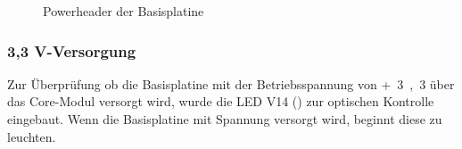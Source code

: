 \begin{figure}[H]
    \centering
    \qquad
    \qquad
    \caption[Powerheader der Basisplatine]{Powerheader der \gls{Basisplatine}}
    \label{fig:basisplatine-pwrhdr}
\end{figure}

\subsubsection{3,3 V-Versorgung}
Zur Überprüfung ob die \gls{Basisplatine} mit der Betriebsspannung von \unit{+3,3}{\volt} über das \gls{Core-Modul} versorgt wird, wurde die LED V14 () zur optischen Kontrolle eingebaut. Wenn die Basisplatine mit Spannung versorgt wird, beginnt diese zu leuchten.

